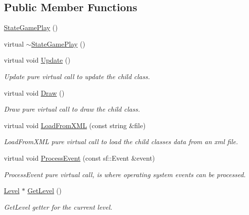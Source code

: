 \subsection*{Public Member Functions}
\begin{DoxyCompactItemize}
\item 
\hyperlink{class_state_game_play_ad7bfeabc7184e166b372e63c68c1ace9}{State\-Game\-Play} ()
\item 
virtual \hyperlink{class_state_game_play_aa4538a8a8ff81e66c0c826249d410c63}{$\sim$\-State\-Game\-Play} ()
\item 
virtual void \hyperlink{class_state_game_play_a56b45e9ee196d709557dac2a3a6f2b3d}{Update} ()
\begin{DoxyCompactList}\small\item\em Update pure virtual call to update the child class. \end{DoxyCompactList}\item 
virtual void \hyperlink{class_state_game_play_a5a4710616480b177cc8164675d5295ae}{Draw} ()
\begin{DoxyCompactList}\small\item\em Draw pure virtual call to draw the child class. \end{DoxyCompactList}\item 
virtual void \hyperlink{class_state_game_play_ab959c0ecf1e0db614a89a87bacd1ead1}{Load\-From\-X\-M\-L} (const string \&file)
\begin{DoxyCompactList}\small\item\em Load\-From\-X\-M\-L pure virtual call to load the child classes data from an xml file. \end{DoxyCompactList}\item 
virtual void \hyperlink{class_state_game_play_a9123dfdcf99f92706a00740245e98d23}{Process\-Event} (const sf\-::\-Event \&event)
\begin{DoxyCompactList}\small\item\em Process\-Event pure virtual call, is where operating system events can be processed. \end{DoxyCompactList}\item 
\hyperlink{class_level}{Level} $\ast$ \hyperlink{class_state_game_play_a5bd072a6e7414b47fd9fcdfa34301aa6}{Get\-Level} ()
\begin{DoxyCompactList}\small\item\em Get\-Level getter for the current level. \end{DoxyCompactList}\end{DoxyCompactItemize}

